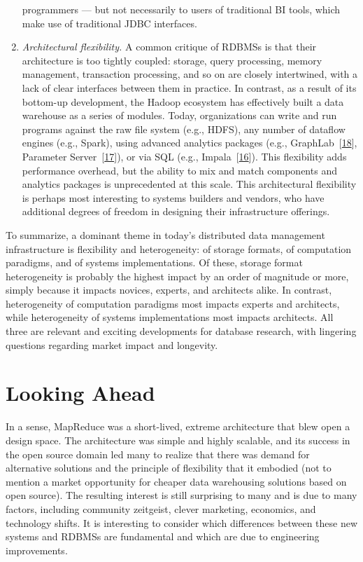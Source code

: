 \documentclass[b5paper,11pt,twoside,openright]{book}
\newcommand\Section[2]{
  \hypertarget{#1}{
    \section{#2}
  }
}
\begin{document}
\begin{enumerate}[label=\arabic*.)]
programmers --- but not necessarily to users of traditional BI tools,
which make use of traditional JDBC interfaces.
\item
\emph{Architectural flexibility.} A common critique of RDBMSs is
that their architecture is too tightly coupled: storage, query
processing, memory management, transaction processing, and so on are
closely intertwined, with a lack of clear interfaces between them in
practice. In contrast, as a result of its bottom-up development, the
Hadoop ecosystem has effectively built a data warehouse as a series of
modules. Today, organizations can write and run programs against the raw
file system (e.g., HDFS), any number of dataflow engines (e.g., Spark),
using advanced analytics packages (e.g.,
GraphLab~{{[}\protect\hyperlink{ref-graphlab}{18}{]}}, Parameter
Server~{{[}\protect\hyperlink{ref-parameterserver}{17}{]}}), or via SQL
(e.g., Impala~{{[}\protect\hyperlink{ref-impala}{16}{]}}). This
flexibility adds performance overhead, but the ability to mix and match
components and analytics packages is unprecedented at this scale. This
architectural flexibility is perhaps most interesting to systems
builders and vendors, who have additional degrees of freedom in
designing their infrastructure offerings.
\end{enumerate}

To summarize, a dominant theme in today's distributed data management
infrastructure is flexibility and heterogeneity: of storage formats, of
computation paradigms, and of systems implementations. Of these, storage
format heterogeneity is probably the highest impact by an order of
magnitude or more, simply because it impacts novices, experts, and
architects alike. In contrast, heterogeneity of computation paradigms
most impacts experts and architects, while heterogeneity of systems
implementations most impacts architects. All three are relevant and
exciting developments for database research, with lingering questions
regarding market impact and longevity.

\Section{looking-ahead}{%
Looking Ahead
}

In a sense, MapReduce was a short-lived, extreme architecture that blew
open a design space. The architecture was simple and highly scalable,
and its success in the open source domain led many to realize that there
was demand for alternative solutions and the principle of flexibility
that it embodied (not to mention a market opportunity for cheaper data
warehousing solutions based on open source). The resulting interest is
still surprising to many and is due to many factors, including community
zeitgeist, clever marketing, economics, and technology shifts. It is
interesting to consider which differences between these new systems and
RDBMSs are fundamental and which are due to engineering improvements.
\end{document}
